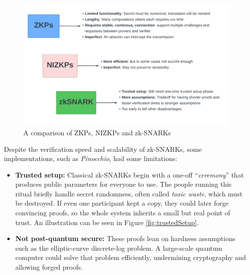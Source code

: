\begin{figure}[h]
    \centering
    \includegraphics[width=1\linewidth]{Images/Chap1/comparisionZK.png}
    \caption{A comparison of ZKPs, NIZKPs and zk-SNARKs \cite{zkcamp}}
    \label{fig:zkpvsnizkp}
\end{figure}

Despite the verification speed and scalability of zk-SNARKs, some implementations, such as \textit{Pinocchio}\cite{pinocchio}, had some limitations:
\begin{itemize}
    \item \textbf{Trusted setup:}  Classical zk-SNARKs begin with a one-off “\textit{ceremony}” that produces public parameters for everyone to use.  The people running this ritual briefly handle secret randomness, often called \textit{toxic waste}, which must be destroyed.  If even one participant kept a copy, they could later forge convincing proofs, so the whole system inherits a small but real point of trust. An illustration can be seen in Figure \ref{fig:trustedSetup}.
    \item \textbf{Not post-quantum secure:}  These proofs lean on hardness assumptions such as the elliptic-curve discrete-log problem.  A large-scale quantum computer could solve that problem efficiently, undermining cryptography and allowing forged proofs.
\end{itemize}

